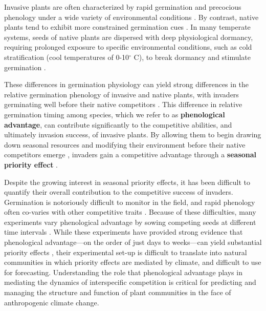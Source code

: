 \documentclass{article}[11pt]
\begin{document}
Invasive plants are often characterized by rapid germination and precocious phenology under a wide variety of environmental conditions \citep{Gioria2018,Gioria:2017wo,Wolkovich:2011uh,Smith:2013uj}. By contrast, native plants tend to exhibit more constrained germination cues \citep{Marushia:2010ug,Wainwright:2013tv,Van-Clef:2001to}. In many temperate systems, seeds of native plants are dispersed with deep physiological dormancy, requiring prolonged exposure to specific environmental conditions, such as cold stratification (cool temperatures of 0-10$^{\circ}$ C), to break dormancy and stimulate germination \citep{Brink:2013wr,Cavieres:2017aa,Bradford:2007tj}.

These differences in germination physiology can yield strong differences in the relative germination phenology of invasive and native plants, with invaders germinating well before their native competitors \citep{Gioria:2017wo}. This difference in relative germination timing among species, which we refer to as \textbf{phenological advantage}, can contribute significantly to the competitive abilities, and ultimately invasion success, of invasive plants. By allowing them to begin drawing down seasonal resources and modifying their environment before their native competitors emerge \citep{Kardol2013}, invaders gain a competitive advantage through a \textbf{seasonal priority effect} \citep{Wainwright_2011}.

Despite the growing interest in seasonal priority effects, it has been difficult to quantify their overall contribution to the competitive success of invaders. Germination is notoriously difficult to monitor in the field, and rapid phenology often co-varies with other competitive traits \citep{Dickson2012,Milbau:2003vt,HAO:2009vh}. %
Because of these difficulties, many experiments vary phenological advantage by sowing competing seeds at different time intervals \citep{Young:2017aa}. While these experiments have provided strong evidence that phenological advantage---on the order of just days to weeks---can yield substantial priority effects \citep{Weidlich:2020aa}, their experimental set-up is difficult to translate into natural communities in which priority effects are mediated by climate, and difficult to use for forecasting. %
Understanding the role that phenological advantage plays in mediating the dynamics of interspecific competition is critical for predicting and managing the structure and function of plant communities in the face of anthropogenic climate change. 
\end{document}
